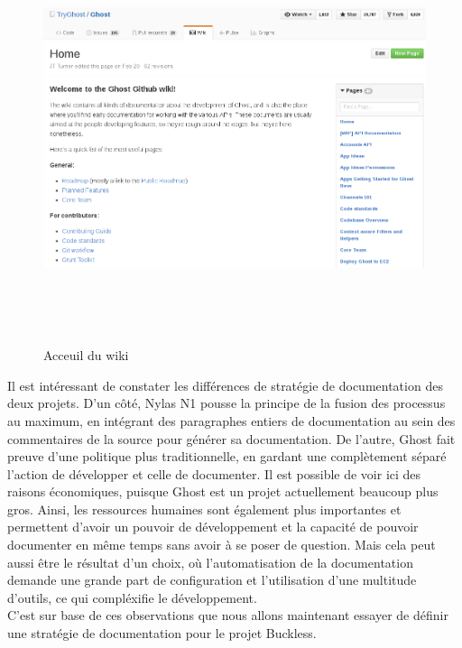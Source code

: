        \begin{figure}[h]
            \centering
            \includegraphics[height=12cm]{./assets/ghost3.png}
            \caption{Acceuil du wiki}
        \end{figure}

        Il est intéressant de constater les différences de stratégie de documentation des deux projets.
        D'un côté, Nylas N1 pousse la principe de la fusion des processus au maximum, en intégrant des
        paragraphes entiers de documentation au sein des commentaires de la source pour générer sa documentation.
        De l'autre, Ghost fait preuve d'une politique plus traditionnelle, en gardant une complètement séparé
        l'action de développer et celle de documenter. Il est possible de voir ici des raisons économiques,
        puisque Ghost est un projet actuellement beaucoup plus gros. Ainsi, les ressources humaines sont
        également plus importantes et permettent d'avoir un pouvoir de développement et la capacité de
        pouvoir documenter en même temps sans avoir à se poser de question. Mais cela peut aussi être
        le résultat d'un choix, où l'automatisation de la documentation demande une grande part de
        configuration et l'utilisation d'une multitude d'outils, ce qui compléxifie le développement.\\
        C'est sur base de ces observations que nous allons maintenant essayer de définir une stratégie
        de documentation pour le projet Buckless.

